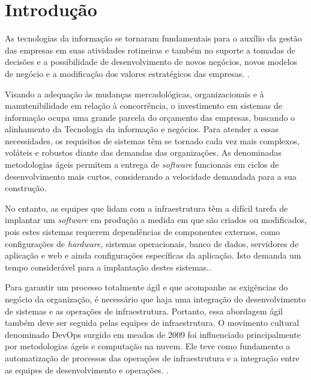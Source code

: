 \section{\esp Introdução}

As tecnologias da informação se tornaram fundamentais para o auxílio da gestão das empresas em suas atividades rotineiras e também no suporte a tomadas de decisões e a possibilidade de desenvolvimento de novos negócios, novos modelos de negócio e a modificação dos valores estratégicos das empresas. \cite{audy}.

Visando a adequação às mudanças mercadológicas, organizacionais e à manutenibilidade em relação à concorrência, o investimento em sistemas de informação ocupa uma grande parcela do orçamento das empresas, buscando o alinhamento da Tecnologia da informação e negócios. \cite{luftman}  
Para atender a essas necessidades, os requisitos de sistemas têm se tornado cada vez mais complexos, voláteis e robustos diante das demandas das organizações. 
As denominadas metodologias ágeis permitem a entrega de \textit{software} funcionais em ciclos de desenvolvimento mais curtos, considerando a velocidade demandada para a sua construção. \cite{sbbrocco} 
          
No entanto, as equipes que lidam com a infraestrutura têm a difícil tarefa de implantar um \textit{software} em produção a medida em que são criados ou modificados, pois estes sistemas requerem dependências de componentes externos, como configurações de \textit{hardware}, sistemas operacionais, banco de dados, servidores de aplicação e web e ainda configurações específicas da aplicação. Isto demanda um tempo considerável para a implantação destes sistemas.\cite{sato}.

Para garantir um processo totalmente ágil e que acompanhe as exigências do negócio da organização, é necessário que haja uma integração do desenvolvimento de sistemas e as operações de infraestrutura. Portanto, essa abordagem ágil também deve ser seguida pelas equipes de infraestrutura.
O movimento cultural denominado DevOps surgido em meados de 2009 foi influenciado principalmente por metodologias ágeis e computação na nuvem. Ele teve como fundamento a automatização de processos das operações de infraestrutura e a integração entre as equipes de desenvolvimento e operações. \cite{sato}.

